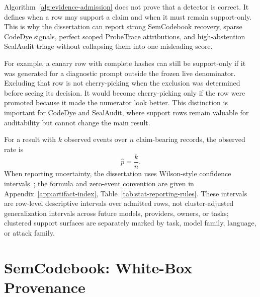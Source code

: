 Algorithm~\ref{alg:evidence-admission} does not prove that a detector is correct. It defines when a row may support a claim and when it must remain support-only. This is why the dissertation can report strong SemCodebook recovery, sparse CodeDye signals, perfect scoped ProbeTrace attributions, and high-abstention SealAudit triage without collapsing them into one misleading score.

For example, a canary row with complete hashes can still be support-only if it was generated for a diagnostic prompt outside the frozen live denominator. Excluding that row is not cherry-picking when the exclusion was determined before seeing its decision. It would become cherry-picking only if the row were promoted because it made the numerator look better. This distinction is important for CodeDye and SealAudit, where support rows remain valuable for auditability but cannot change the main result.

For a result with $k$ observed events over $n$ claim-bearing records, the observed rate is
\begin{equation}
  \hat{p} = \frac{k}{n}.
\end{equation}
When reporting uncertainty, the dissertation uses Wilson-style confidence intervals~\cite{wilson1927probable}; the formula and zero-event convention are given in Appendix~\ref{app:artifact-index}, Table~\ref{tab:stat-reporting-rules}. These intervals are row-level descriptive intervals over admitted rows, not cluster-adjusted generalization intervals across future models, providers, owners, or tasks; clustered support surfaces are separately marked by task, model family, language, or attack family.

\section{SemCodebook: White-Box Provenance}

